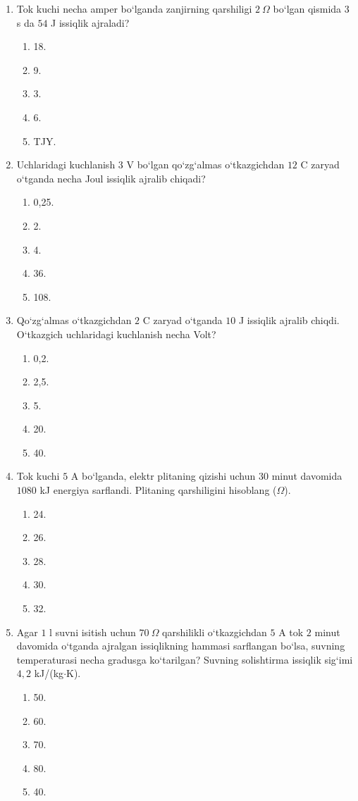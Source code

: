 \begin{enumerate}
\item Tok kuchi necha amper bo‘lganda zanjirning qarshiligi $2~\Omega$ bo‘lgan qismida $3$ s da $54$ J issiqlik ajraladi?
\begin{enumerate}[label=\Alph*)]
\item 18.
\item 9.
\item 3.
\item 6.
\item TJY.
\end{enumerate}

\item Uchlaridagi kuchlanish $3$ V bo‘lgan qo‘zg‘almas o‘tkazgichdan $12$ C zaryad o‘tganda necha Joul issiqlik ajralib chiqadi?
\begin{enumerate}[label=\Alph*)]
\item 0,25.
\item 2.
\item 4.
\item 36.
\item 108.
\end{enumerate}

\item Qo‘zg‘almas o‘tkazgichdan $2$ C zaryad o‘tganda $10$ J issiqlik ajralib chiqdi. O‘tkazgich uchlaridagi kuchlanish necha Volt?
\begin{enumerate}[label=\Alph*)]
\item 0,2.
\item 2,5.
\item 5.
\item 20.
\item 40.
\end{enumerate}

\item Tok kuchi $5$ A bo‘lganda, elektr plitaning qizishi uchun $30$ minut davomida $1080$ kJ energiya sarflandi. Plitaning qarshiligini hisoblang ($\Omega$).
\begin{enumerate}[label=\Alph*)]
\item 24.
\item 26.
\item 28.
\item 30.
\item 32.
\end{enumerate}

\item Agar $1$ l suvni isitish uchun $70~\Omega$ qarshilikli o‘tkazgichdan $5$ A tok $2$ minut davomida o‘tganda ajralgan issiqlikning hammasi sarflangan bo‘lsa, suvning temperaturasi necha gradusga ko‘tarilgan? Suvning solishtirma issiqlik sig‘imi $4,2$ kJ/(kg$\cdot$K).
\begin{enumerate}[label=\Alph*)]
\item 50.
\item 60.
\item 70.
\item 80.
\item 40.
\end{enumerate}


\end{enumerate}
